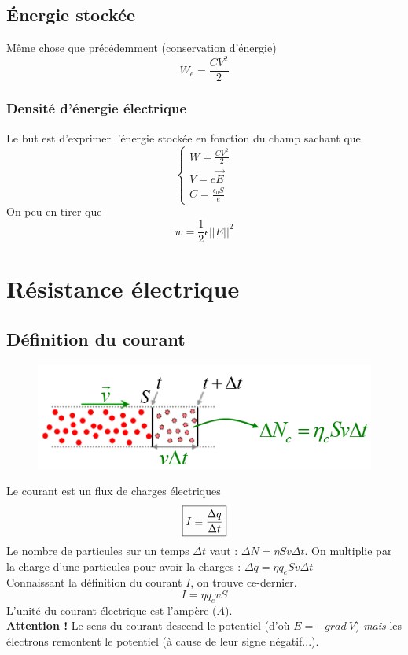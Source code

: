 \documentclass	[11pt, a4paper, openany]{book}
\begin{document}
\subsection{Énergie stockée}
Même chose que précédemment (conservation d'énergie)
\begin{equation}
	W_e = \frac{CV^2}{2}
\end{equation}
\subsubsection{Densité d'énergie électrique}
Le but est d'exprimer l'énergie stockée en fonction du champ sachant  que
\begin{equation}
	\left\{\begin{array}{l}
	W = \frac{CV^2}{2}\\
	V = e\vec{E}\\
	C = \frac{\epsilon_0 S}{e}
	\end{array}\right.
\end{equation}
On peu en tirer que 
\begin{equation}
	w = \frac{1}{2}\epsilon||E||^2
\end{equation}


\section{Résistance électrique}
\subsection{Définition du courant}
\begin{figure}
	\includegraphics[scale=0.44]{es/image17.png}
\end{figure}
Le courant est un flux de charges électriques 
\begin{equation}
	\fbox{$I \equiv \dfrac{\Delta q}{\Delta t}$}
\end{equation}
Le nombre de particules sur un temps $\Delta t$ vaut : $\Delta N =  \eta S v\Delta t$. On multiplie par la charge d'une particules pour avoir la charges : $\Delta q = \eta q_e S v\Delta t$\\
Connaissant la définition du courant $I$, on trouve ce-dernier.
\begin{equation}
	I = \eta q_e vS
\end{equation}
L'unité du courant électrique est l'ampère ($A$).\\
\textbf{Attention !} Le sens du courant descend le potentiel (d'où $E = -grad\ V$) \textit{mais} les électrons remontent le potentiel (à cause de leur signe négatif...).
\end{document}
